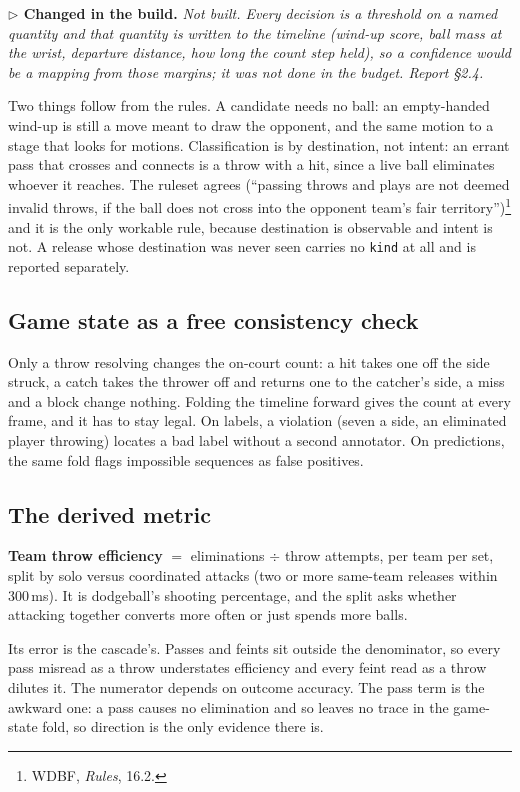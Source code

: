 \documentclass[10pt,a4paper]{article}
\newcommand{\changed}[1]{%
  \par\smallskip\noindent
  {\color{accent!88!black}\small\textbf{$\triangleright$ Changed in the build.} \textit{#1}}\par\smallskip}
\begin{document}
\changed{Not built. Every decision is a threshold on a named quantity and that quantity is
written to the timeline (wind-up score, ball mass at the wrist, departure distance, how long
the count step held), so a confidence would be a mapping from those margins; it was not done
in the budget. Report \S2.4.}

Two things follow from the rules. A candidate needs no ball: an empty-handed wind-up is
still a move meant to draw the opponent, and the same motion to a stage that looks for
motions. Classification is by destination, not intent: an errant pass that crosses and
connects is a throw with a hit, since a live ball eliminates whoever it reaches. The ruleset
agrees (``passing throws and plays are not deemed invalid throws, if the ball does not cross
into the opponent team's fair territory'')\footnote{WDBF, \emph{Rules}, 16.2.} and it is
the only workable rule, because destination is observable and intent is not. A release whose
destination was never seen carries no \texttt{kind} at all and is reported separately.

\subsection{Game state as a free consistency check}

Only a throw resolving changes the on-court count: a hit takes one off the side struck, a
catch takes the thrower off and returns one to the catcher's side, a miss and a block change
nothing. Folding the timeline forward gives the count at every frame, and it has to stay
legal. On labels, a violation (seven a side, an eliminated player throwing) locates a bad
label without a second annotator. On predictions, the same fold flags impossible sequences as
false positives.

\subsection{The derived metric}

\textbf{Team throw efficiency} $=$ eliminations $\div$ throw attempts, per team per set,
split by solo versus coordinated attacks (two or more same-team releases within 300\,ms). It
is dodgeball's shooting percentage, and the split asks whether attacking together converts
more often or just spends more balls.

Its error is the cascade's. Passes and feints sit outside the denominator, so every pass
misread as a throw understates efficiency and every feint read as a throw dilutes it. The
numerator depends on outcome accuracy. The pass term is the awkward one: a pass causes no
elimination and so leaves no trace in the game-state fold, so direction is the only evidence
there is.
\end{document}
